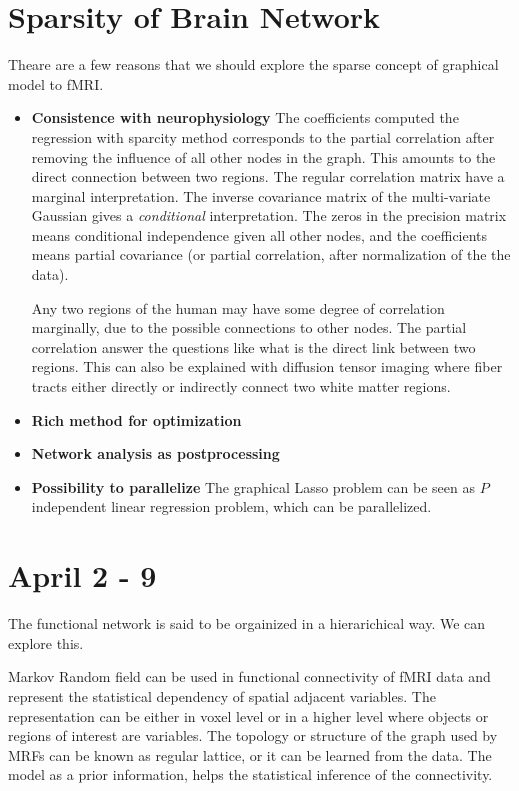 \documentclass[12pt]{article}
\begin{document}
\section{Sparsity of Brain Network}
Theare are a few reasons that we should explore the sparse concept of graphical
model to fMRI.
\begin{itemize}
  \item \textbf{Consistence with neurophysiology} The coefficients computed the
    regression with sparcity method corresponds to the partial correlation after
    removing the influence of all other nodes in the graph. This amounts to the
    direct connection between two regions. The regular correlation matrix have a
    marginal interpretation. The inverse covariance matrix of the multi-variate
    Gaussian gives a \emph{conditional} interpretation. The zeros in the
    precision matrix means conditional independence given all other nodes, and
    the coefficients means partial covariance (or partial correlation, after
    normalization of the the data).

    Any two regions of the human may have some degree of correlation marginally,
    due to the possible connections to other nodes. The partial correlation
    answer the questions like what is the direct link between two regions. This
    can also be explained with diffusion tensor imaging where fiber tracts
    either directly or indirectly connect two white matter regions.

  \item \textbf{Rich method for optimization}
  \item \textbf{Network analysis as postprocessing}
  \item \textbf{Possibility to parallelize} The graphical Lasso problem can be
    seen as $P$ independent linear regression problem, which can be
    parallelized.
\end{itemize}

\section{April 2 - 9}
The functional network is said to be orgainized in a hierarichical way. We can
explore this.

Markov Random field can be used in functional connectivity of fMRI data and
represent the statistical dependency of spatial adjacent variables. The
representation can be either in voxel level or in a higher level where objects
or regions of interest are variables. The topology or structure of the graph
used by MRFs can be known as regular lattice, or it can be learned from the
data. The model as a prior information, helps the statistical inference of the
connectivity.
\end{document}
